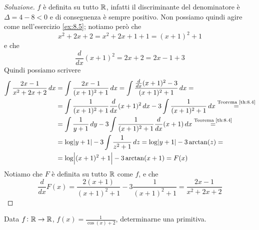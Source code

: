 \begin{proof}[Soluzione]
    $f$ è definita su tutto $\amsbb{R}$, infatti il discriminante del denominatore è $\Delta = 4-8 <0$ e di conseguenza è sempre positivo. Non possiamo quindi agire come nell'esercizio \ref{ex:8.5}; notiamo però che
    \[
    x^2+2x+2 = x^2 +2x+1 +1 = (x+1)^2+1
    \]
    e che 
    \[
    \frac{d}{dx}(x+1)^2 = 2x+2 = 2x-1+3
    \]
    Quindi possiamo scrivere
    \[
    \begin{split}
        \int \frac{2x-1}{x^2+2x+2}\, dx & = \int \frac{2x-1}{(x+1)^2+1}\, dx = \int \frac{\frac{d}{dx}(x+1)^2-3}{(x+1)^2+1}\, dx = \\
        & = \int \frac{1}{(x+1)^2+1}\frac{d}{dx}(x+1)^2\, dx -3\int \frac{1}{(x+1)^2+1}\, dx \overset{\text{Teorema \ref{th:8.4}}}{=} \\
        & = \int \frac{1}{y+1}\, dy -3\int \frac{1}{(x+1)^2+1} \frac{d}{dx}(x+1)\, dx \overset{\text{Teorema \ref{th:8.4}}}{=} \\
        & = \log\abs{y+1} -3 \int \frac{1}{z^2+1}\, dz = \log\abs{y+1}-3\arctan(z) = \\
        & = \log\abs{(x+1)^2+1} -3\arctan(x+1) = F(x)
    \end{split}
    \]
    Notiamo che $F$ è definita su tutto $\amsbb{R}$ come $f$, e che
    \[
    \frac{d}{dx}F(x) = \frac{2(x+1)}{(x+1)^2+1}-3\frac{1}{(x+1)^2+1} = \frac{2x-1}{x^2+2x+2}
    \]
\end{proof}
\begin{exercise}
    \label{ex:8.7}
    Data $f\colon \amsbb{R}\to \amsbb{R}$, $f(x) = \frac{1}{\cos(x)+2}$, determinarne una primitiva.
\end{exercise}
